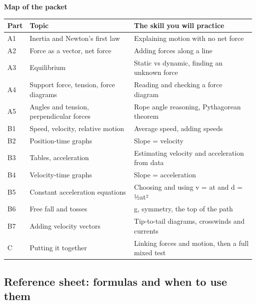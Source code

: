 \documentclass[
]{article}
\newcounter{none} %
\begin{document}
\textbf{Map of the packet}

{\def\LTcaptype{none} %
\begin{longtable}[]{@{}
  >{\raggedright\arraybackslash}p{}
  >{\raggedright\arraybackslash}p{}
  >{\raggedright\arraybackslash}p{}@{}}
\toprule\noalign{}
\begin{minipage}[b]{\linewidth}\raggedright
Part
\end{minipage} & \begin{minipage}[b]{\linewidth}\raggedright
Topic
\end{minipage} & \begin{minipage}[b]{\linewidth}\raggedright
The skill you will practice
\end{minipage} \\
\midrule\noalign{}
\endhead
\bottomrule\noalign{}
\endlastfoot
A1 & Inertia and Newton's first law & Explaining motion with no net
force \\
A2 & Force as a vector, net force & Adding forces along a line \\
A3 & Equilibrium & Static vs dynamic, finding an unknown force \\
A4 & Support force, tension, force diagrams & Reading and checking a
force diagram \\
A5 & Angles and tension, perpendicular forces & Rope angle reasoning,
Pythagorean theorem \\
B1 & Speed, velocity, relative motion & Average speed, adding speeds \\
B2 & Position-time graphs & Slope = velocity \\
B3 & Tables, acceleration & Estimating velocity and acceleration from
data \\
B4 & Velocity-time graphs & Slope = acceleration \\
B5 & Constant acceleration equations & Choosing and using v = at and d =
½at² \\
B6 & Free fall and tosses & g, symmetry, the top of the path \\
B7 & Adding velocity vectors & Tip-to-tail diagrams, crosswinds and
currents \\
C & Putting it together & Linking forces and motion, then a full mixed
test \\
\end{longtable}
}

\subsection{Reference sheet: formulas and when to use
them}\label{reference-sheet-formulas-and-when-to-use-them}
\end{document}
